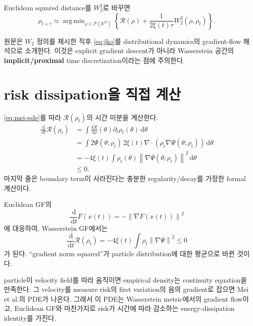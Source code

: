 \documentclass[11pt,a4paper,oneside,openany]{memoir}
\newcommand{\R}{\mathbb{R}}
\newcommand{\Risk}{\mathcal{R}}
\newcommand{\grad}{\nabla}
\newcommand{\dd}{\,\mathrm{d}}
\newcommand{\diver}{\nabla\!\cdot}
\newcommand{\norm}[1]{\left\lVert #1\right\rVert}
\DeclareMathOperator*{\argmin}{arg\,min}
\theoremstyle{definition}
\begin{document}
Euclidean squared distance를 $W_2^2$로 바꾸면
\begin{equation}
  \rho_{t+\tau}
  \approx
  \argmin_{\rho\in\mathcal P(\R^D)}
  \left\{
    \Risk(\rho)
    +\frac{1}{2\xi(t)\tau}W_2^2(\rho,\rho_t)
  \right\}.
\label{eq:jko}
\end{equation}

\begin{paperbox}[--- Mei et al., Eq. (9)--(10)]
원문은 $W_2$ 정의를 제시한 직후 \eqref{eq:jko}를 distributional dynamics의
gradient-flow 해석으로 소개한다. 이것은 explicit gradient descent가 아니라
Wasserstein 공간의 \textbf{implicit/proximal} time discretization이라는 점에 주의한다.
\end{paperbox}

\section{risk dissipation을 직접 계산}

\eqref{eq:mei-pde}를 따라 $\Risk(\rho_t)$의 시간 미분을 계산한다.
\begin{align*}
\frac{\dd}{\dd t}\Risk(\rho_t)
&=\int
  \frac{\delta\Risk}{\delta\rho}(\theta)
  \partial_t\rho_t(\theta)\dd\theta\\
&=\int 2\Psi(\theta;\rho_t)\,
  2\xi(t)\diver\left(
    \rho_t\grad\Psi(\theta;\rho_t)
  \right)\dd\theta\\
&=-4\xi(t)
  \int \rho_t(\theta)
  \norm{\grad\Psi(\theta;\rho_t)}^2\dd\theta\\
&\le0.
\end{align*}
마지막 줄은 boundary term이 사라진다는 충분한 regularity/decay를 가정한 formal 계산이다.

\begin{keybox}
Euclidean GF의
\[
  \frac{\dd}{\dd t}F(x(t))=-\norm{\grad F(x(t))}^2
\]
에 대응하여, Wasserstein GF에서는
\[
  \frac{\dd}{\dd t}\Risk(\rho_t)
  =-4\xi(t)\int\rho_t\norm{\grad\Psi}^2\le0
\]
가 된다. ``gradient norm squared''가 particle distribution에 대한 평균으로 바뀐 것이다.
\end{keybox}

\begin{presentbox}
particle이 velocity field를 따라 움직이면 empirical density는 continuity equation을 만족한다.
그 velocity를 measure risk의 first variation의 음의 gradient로 잡으면 Mei et al.의 PDE가 나온다.
그래서 이 PDE는 Wasserstein metric에서의 gradient flow이고, Euclidean GF와 마찬가지로 risk가
시간에 따라 감소하는 energy-dissipation identity를 가진다.
\end{presentbox}
\end{document}
